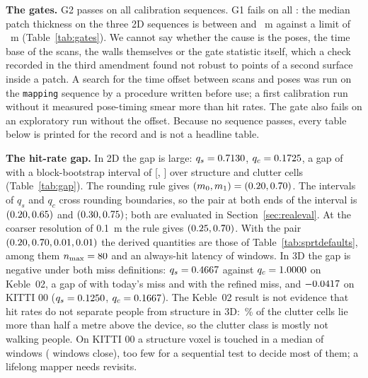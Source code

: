 \noindent\textbf{The gates.} G2 passes on all \CalGateSeq{} calibration sequences. G1 fails on all \CalGateGoneFail{}: the median patch thickness on the three 2D sequences is between \CalGoneMedLo{} and \CalGoneMedHi{}~m against a limit of \CalGoneLimMed{}~m (Table~\ref{tab:gates}). We cannot say whether the cause is the poses, the time base of the scans, the walls themselves or the gate statistic itself, which a check recorded in the third amendment found not robust to points of a second surface inside a patch. A search for the time offset between scans and poses was run on the \texttt{mapping} sequence by a procedure written before use; a first calibration run without it measured pose-timing smear more than hit rates. The gate also fails on an exploratory run without the offset. Because no sequence passes, every table below is printed for the record and is not a headline table.



\noindent\textbf{The hit-rate gap.} In 2D the gap is large: $q_s=0.7130$, $q_c=0.1725$, a gap of \CalGap{} with a block-bootstrap interval of [\CalGapLo, \CalGapHi] over \CalNstruct{} structure and \CalNclutter{} clutter cells (Table~\ref{tab:gap}). The rounding rule gives $(m_0,m_1)=(0.20,0.70)$. The intervals of $q_s$ and $q_c$ cross rounding boundaries, so the pair at both ends of the interval is $(0.20,0.65)$ and $(0.30,0.75)$; both are evaluated in Section~\ref{sec:realeval}. At the coarser resolution of 0.1~m the rule gives $(0.25,0.70)$. With the pair $(0.20,0.70,0.01,0.01)$ the derived quantities are those of Table~\ref{tab:sprtdefaults}, among them $n_{\max}=80$ and an always-hit latency of \CalLatCond{} windows. In 3D the gap is negative under both miss definitions: $q_s=0.4667$ against $q_c=1.0000$ on Keble~02, a gap of \CalKebGapToday{} with today's miss and \CalKebGapRefined{} with the refined miss, and $-0.0417$ on KITTI 00 ($q_s=0.1250$, $q_c=0.1667$). The Keble~02 result is not evidence that hit rates do not separate people from structure in 3D: \CalKebAbove\,\% of the clutter cells lie more than half a metre above the device, so the clutter class is mostly not walking people. On KITTI 00 a structure voxel is touched in a median of \CalKittiMed{} windows (\CalKittiWindows{} windows close), too few for a sequential test to decide most of them; a lifelong mapper needs revisits.



